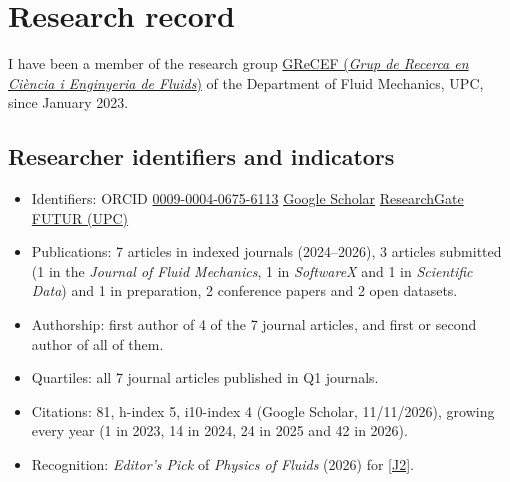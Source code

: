 \documentclass[11pt]{article}
\begin{document}
\section{Research record}
I have been a member of the research group
\href{https://mf.upc.edu/ca/recerca-1/grecef-grup-de-recerca-en-ciencia-i-enginyeria-de-fluids}{GReCEF
(\emph{Grup de Recerca en Ci\`encia i Enginyeria de Fluids})} of the Department of Fluid
Mechanics, UPC, since January 2023.

\subsection{Researcher identifiers and indicators}
\begin{itemize}
  \item Identifiers: ORCID \href{https://orcid.org/0009-0004-0675-6113}{0009-0004-0675-6113}
  \docsep \href{https://scholar.google.com/citations?user=5nNJuHsAAAAJ&hl=en}{Google Scholar}
  \docsep \href{https://www.researchgate.net/profile/Carlos-Monteiro-19}{ResearchGate} \docsep
  \href{https://futur.upc.edu/CarlosAlexandreBandarrinhaMonteiro}{FUTUR (UPC)}
  \item Publications: 7 articles in indexed journals (2024--2026), 3 articles submitted (1 in the \emph{Journal of Fluid Mechanics}, 1 in \emph{SoftwareX} and
  1 in \emph{Scientific Data}) and 1 in preparation, 2 conference papers and 2 open datasets.
  \item Authorship: first author of 4 of the 7 journal articles, and first or second
  author of all of them.
  \item Quartiles: all 7 journal articles published in Q1 journals.
  \item Citations: 81, h-index 5, i10-index 4 (Google Scholar, 11/11/2026), growing every
  year (1 in 2023, 14 in 2024, 24 in 2025 and 42 in 2026).
  \item Recognition: \emph{Editor's Pick} of \emph{Physics of Fluids} (2026) for [\hyperlink{pub-J2}{J2}].
\end{itemize}
\end{document}
